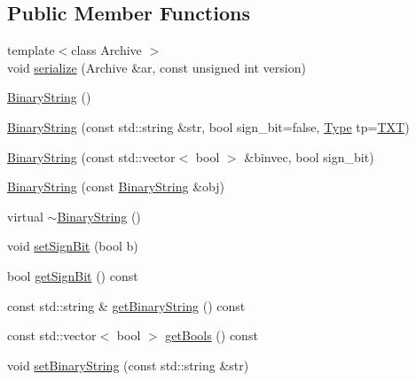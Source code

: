 \subsection*{\-Public \-Member \-Functions}
\begin{DoxyCompactItemize}
\item 
{\footnotesize template$<$class Archive $>$ }\\void \hyperlink{classcryomesh_1_1state_1_1BinaryString_af23aecbe6785a7e134aa6e247f4c160b}{serialize} (\-Archive \&ar, const unsigned int version)
\item 
\hyperlink{classcryomesh_1_1state_1_1BinaryString_a3e133c657f04c3ee2a895d2df988b306}{\-Binary\-String} ()
\item 
\hyperlink{classcryomesh_1_1state_1_1BinaryString_a023550e6e1753c5c1d64d308b55a9ff0}{\-Binary\-String} (const std\-::string \&str, bool sign\-\_\-bit=false, \hyperlink{classcryomesh_1_1state_1_1BinaryString_adaad1428a9b504122a82b03879748466}{\-Type} tp=\hyperlink{classcryomesh_1_1state_1_1BinaryString_adaad1428a9b504122a82b03879748466ae29b88acd457612271587fc8a11b252a}{\-T\-X\-T})
\item 
\hyperlink{classcryomesh_1_1state_1_1BinaryString_acd8030555e7e8962ba2f587f3712fb79}{\-Binary\-String} (const std\-::vector$<$ bool $>$ \&binvec, bool sign\-\_\-bit)
\item 
\hyperlink{classcryomesh_1_1state_1_1BinaryString_ac8de3e6cf11d94161865ae78e7494397}{\-Binary\-String} (const \hyperlink{classcryomesh_1_1state_1_1BinaryString}{\-Binary\-String} \&obj)
\item 
virtual \hyperlink{classcryomesh_1_1state_1_1BinaryString_a64283f9b44fe2216d66458f083d92e38}{$\sim$\-Binary\-String} ()
\item 
void \hyperlink{classcryomesh_1_1state_1_1BinaryString_a61f0e88355bd60fd6df43b418170ded6}{set\-Sign\-Bit} (bool b)
\item 
bool \hyperlink{classcryomesh_1_1state_1_1BinaryString_a01370c6d213baea734c41ee6225fb69c}{get\-Sign\-Bit} () const 
\item 
const std\-::string \& \hyperlink{classcryomesh_1_1state_1_1BinaryString_ad5f20b679d6ee977abf389f4cb252bbe}{get\-Binary\-String} () const 
\item 
const std\-::vector$<$ bool $>$ \hyperlink{classcryomesh_1_1state_1_1BinaryString_aed4c3e5869c8c62b8d189d59e731b8da}{get\-Bools} () const 
\item 
void \hyperlink{classcryomesh_1_1state_1_1BinaryString_aa1666a479090e4ad5aefb28a09f98476}{set\-Binary\-String} (const std\-::string \&str)

\end{DoxyCompactItemize}
